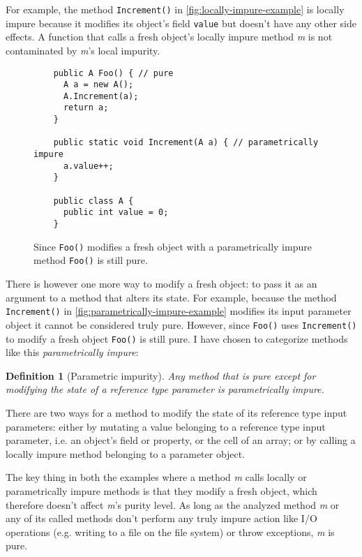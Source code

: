 \documentclass[a4paper,12pt]{article}
\newtheorem{definition}{Definition} %
\begin{document}
For example, the method \texttt{Increment()} in \autoref{fig:locally-impure-example} is locally impure because it modifies its object's field \texttt{value} but doesn't have any other side effects. A function that calls a fresh object's locally impure method \textit{m} is not contaminated by \textit{m}'s local impurity.

\begin{figure}
  \centering
  \begin{lstlisting}
    public A Foo() { // pure
      A a = new A();
      A.Increment(a);
      return a;
    }

    public static void Increment(A a) { // parametrically impure
      a.value++;
    }

    public class A {
      public int value = 0;
    }
  \end{lstlisting}
  \caption{Since \texttt{Foo()} modifies a fresh object with a parametrically impure method \texttt{Foo()} is still pure.}
  \label{fig:parametrically-impure-example}
\end{figure}

There is however one more way to modify a fresh object: to pass it as an argument to a method that alters its state. For example, because the method \texttt{Increment()} in \autoref{fig:parametrically-impure-example} modifies its input parameter object it cannot be considered truly pure. However, since \texttt{Foo()} uses \texttt{Increment()} to modify a fresh object \texttt{Foo()} is still pure. I have chosen to categorize methods like this \textit{parametrically impure}:

\begin{definition}[Parametric impurity] \label{def:parametrically-impure}
  Any method that is pure except for modifying the state of a reference type parameter is parametrically impure.
\end{definition}

There are two ways for a method to modify the state of its reference type input parameters: either by mutating a value belonging to a reference type input parameter, i.e. an object's field or property, or the cell of an array; or by calling a locally impure method belonging to a parameter object.

The key thing in both the examples where a method \textit{m} calls locally or parametrically impure methods is that they modify a fresh object, which therefore doesn't affect \textit{m}'s purity level. As long as the analyzed method \textit{m} or any of its called methods don't perform any truly impure action like I/O operations (e.g. writing to a file on the file system) or throw exceptions, \textit{m} is pure.
\end{document}
